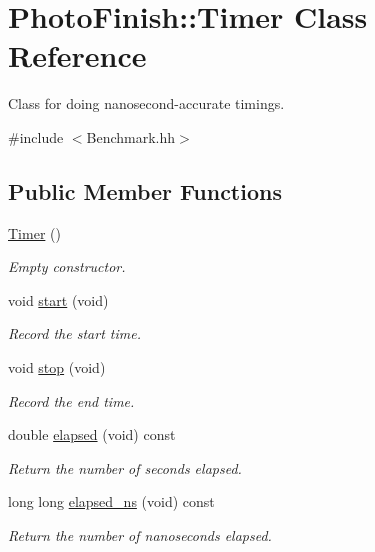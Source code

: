 \hypertarget{class_photo_finish_1_1_timer}{}\section{Photo\+Finish\+:\+:Timer Class Reference}
\label{class_photo_finish_1_1_timer}


Class for doing nanosecond-\/accurate timings.  




{\ttfamily \#include $<$Benchmark.\+hh$>$}

\subsection*{Public Member Functions}
\begin{DoxyCompactItemize}
\item 
\hyperlink{class_photo_finish_1_1_timer_a29642b3310f111b0b1f3b7abe2d5c194}{Timer} ()
\begin{DoxyCompactList}\small\item\em Empty constructor. \end{DoxyCompactList}\item 
void \hyperlink{class_photo_finish_1_1_timer_ae78ca8dbd0d6941f38089c00670e1026}{start} (void)
\begin{DoxyCompactList}\small\item\em Record the start time. \end{DoxyCompactList}\item 
void \hyperlink{class_photo_finish_1_1_timer_ac7561d15636df785b1ef02eec31151e4}{stop} (void)
\begin{DoxyCompactList}\small\item\em Record the end time. \end{DoxyCompactList}\item 
double \hyperlink{class_photo_finish_1_1_timer_a77d32536b682c7482a9374ef2d32ad3c}{elapsed} (void) const
\begin{DoxyCompactList}\small\item\em Return the number of seconds elapsed. \end{DoxyCompactList}\item 
long long \hyperlink{class_photo_finish_1_1_timer_a147dff662681f10ad8afd1b5492f7c6a}{elapsed\+\_\+ns} (void) const
\begin{DoxyCompactList}\small\item\em Return the number of nanoseconds elapsed. \end{DoxyCompactList}\end{DoxyCompactItemize}


